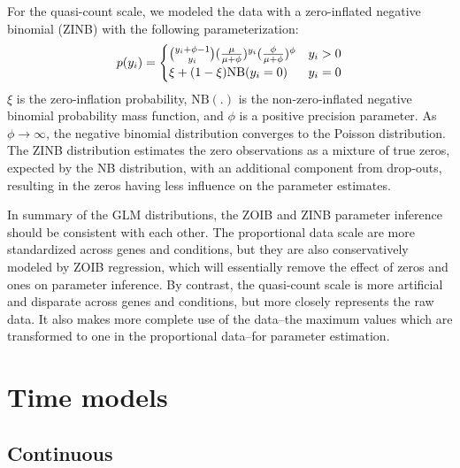\documentclass[12pt]{extarticle}
\begin{document}
For the quasi-count scale, we modeled the data with a zero-inflated negative binomial (ZINB) with the following parameterization:
\begin{equation}
	p(y_{i}) = \begin{cases} 
			{{y_{i} + \phi - 1}\choose y_{i}} \large(\frac{\mu}{\mu + \phi}\large)^{y_{i}}\large(\frac{\phi}{\mu + \phi}\large)^{\phi} & y_{i} > 0 \\
      			\xi + (1 - \xi)\text{NB}(y_{i} = 0) & y_{i} = 0
   			\end{cases}
\end{equation}
$\xi$ is the zero-inflation probability, $\text{NB}(.)$ is the non-zero-inflated negative binomial probability mass function, and $\phi$ is a positive precision parameter. As $\phi \rightarrow \infty$, the negative binomial distribution converges to the Poisson distribution. The ZINB distribution estimates the zero observations as a mixture of true zeros, expected by the NB distribution, with an additional component from drop-outs, resulting in the zeros having less influence on the parameter estimates.

In summary of the GLM distributions, the ZOIB and ZINB parameter inference should be consistent with each other. The proportional data scale are more standardized across genes and conditions, but they are also conservatively modeled by ZOIB regression, which will essentially remove the effect of zeros and ones on parameter inference. By contrast, the quasi-count scale is more artificial and disparate across genes and conditions, but more closely represents the raw data. It also makes more complete use of the data--the maximum values which are transformed to one in the proportional data--for parameter estimation.

\section*{Time models}

\subsection*{Continuous}
\end{document}
